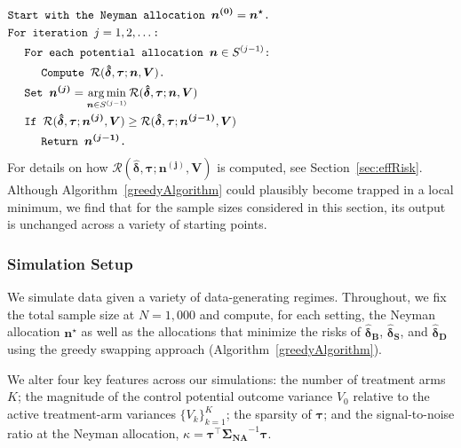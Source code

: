 \documentclass{article}
\newcommand{\bsSigmaN}{\boldsymbol {\Sigma_{\textbf{NA}}}}
\newcommand{\bstau}{\boldsymbol \tau}
\newcommand{\bsn}{\boldsymbol n}
\newcommand{\bsdeltad}{\boldsymbol{\hat \delta_{\textbf{D}}}}
\newcommand{\bsdelt}{\boldsymbol{\hat \delta}}
\newcommand{\bsdeltb}{\boldsymbol {\hat \delta_B}}
\newcommand{\bsdelts}{\boldsymbol {\hat \delta_S}}
\DeclareMathOperator*{\argmin}{arg\,min}
\begin{document}
\begin{equation}\label{greedyAlgorithm}
\begin{aligned}
& \texttt{Start with  the Neyman allocation $\boldsymbol{n^{(0)}} = \boldsymbol{n^\star}$.} \hspace{55mm} \\
& \texttt{For iteration $j = 1, 2, \dots$:}\\
& \hspace{5mm} \texttt{For each potential allocation $\bsn \in S^{(j-1)}$:}\\
& \hspace{10mm} \texttt{Compute $\mathcal R(\bsdelt, \bstau ; \bsn,\boldsymbol V)$. } \\
& \hspace{5mm} \texttt{Set $\boldsymbol{n^{(j)}} = \argmin_{\bsn \in S^{(j - 1)}} \mathcal R(\bsdelt, \bstau ; \bsn,\boldsymbol V)$} \\
& \hspace{5mm} \texttt{If $\mathcal R(\bsdelt, \bstau ; \boldsymbol{n^{(j)}},\boldsymbol V) \geq \mathcal R(\bsdelt, \bstau ; \boldsymbol{n^{(j-1)}},\boldsymbol V)$}\\
& \hspace{10mm} \texttt{Return $\boldsymbol{n^{(j-1)}}$.}
\end{aligned}
\end{equation}
For details on how $\mathcal R(\bsdelt, \bstau ; \boldsymbol{n^{(j)}},\boldsymbol V)$ is computed, see Section~\ref{sec:effRisk}. Although Algorithm~\ref{greedyAlgorithm} could plausibly become trapped in a local minimum, we find that for the sample sizes considered in this section, its output is unchanged across a variety of starting points.

\subsubsection{Simulation Setup}\label{sec:simSetup}

We simulate data given a variety of data-generating regimes. Throughout, we fix the total sample size at $N=1,000$ and compute, for each setting, the Neyman allocation $\boldsymbol n^\star$ as well as the allocations that minimize the risks of $\bsdeltb$, $\bsdelts$, and $\bsdeltad$ using the greedy swapping approach (Algorithm~\ref{greedyAlgorithm}).

We alter four key features across our simulations: the number of treatment arms $K$; the magnitude of the control potential outcome variance $V_0$ relative to the active treatment-arm variances $\{V_k\}_{k=1}^K$; the sparsity of $\bstau$; and the signal-to-noise ratio at the Neyman allocation, $\kappa=\bstau^\top\bsSigmaN^{-1}\bstau$. 
\end{document}
